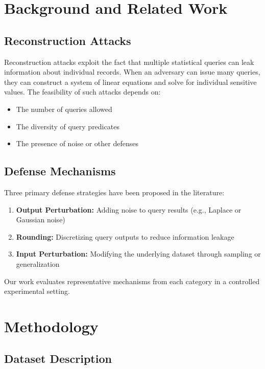 \documentclass[11pt,letterpaper]{article}
\begin{document}
\section{Background and Related Work}

\subsection{Reconstruction Attacks}

Reconstruction attacks exploit the fact that multiple statistical queries can leak information about individual records. When an adversary can issue many queries, they can construct a system of linear equations and solve for individual sensitive values. The feasibility of such attacks depends on:

\begin{itemize}[leftmargin=*]
    \item The number of queries allowed
    \item The diversity of query predicates
    \item The presence of noise or other defenses
\end{itemize}

\subsection{Defense Mechanisms}

Three primary defense strategies have been proposed in the literature:

\begin{enumerate}[leftmargin=*]
    \item \textbf{Output Perturbation:} Adding noise to query results (e.g., Laplace or Gaussian noise)
    \item \textbf{Rounding:} Discretizing query outputs to reduce information leakage
    \item \textbf{Input Perturbation:} Modifying the underlying dataset through sampling or generalization
\end{enumerate}

Our work evaluates representative mechanisms from each category in a controlled experimental setting.

\section{Methodology}

\subsection{Dataset Description}
\end{document}
